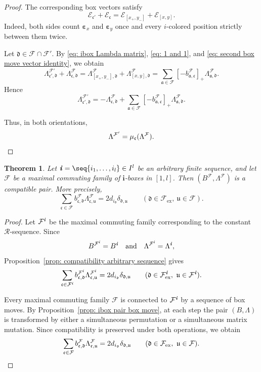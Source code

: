 \documentclass[12pt, leqno]{amsart}
\numberwithin{equation}{section}
\theoremstyle{plain}
\newtheorem{theorem}[lemma]{Theorem}
\theoremstyle{definition}
\newcommand{\ex}{\mathrm{ex}}
\newcommand{\ve}{\boldsymbol{\varepsilon}}
\newcommand{\ii}{ \textbf{\textit{i}}}
\newcommand{\fraka}{\mathfrak{a}}
\newcommand{\frakc}{\mathfrak{c}}
\newcommand{\frakd}{\mathfrak{d}}
\newcommand{\fraku}{\mathfrak{u}}
\newcommand{\bfi}{\mathbf{i}}
\newcommand{\calE}{\mathcal{E}}
\newcommand{\calF}{\mathcal{F}}
\newcommand{\calR}{\mathcal{R}}
\newcommand{\qtq}[1][{and}]{\quad\text{{#1}}\quad}
\begin{document}
\begin{proof}
The corresponding box vectors satisfy
\begin{equation}\label{eq: second box move vector identity}
\calE_{\frakc'}+\calE_{\frakc} = \calE_{[x_+,y_-]}+\calE_{[x,y]}.
\end{equation}
Indeed, both sides count $\ve_x$ and $\ve_y$
once and every $i$-colored position strictly between them twice.

Let $\frakd\in\calF\cap\calF'$. By
\eqref{eq: ibox Lambda matrix},
\eqref{eq: 1 and 1}, and
\eqref{eq: second box move vector identity}, we obtain
\[
\Lambda^{\calF'}_{\frakc',\frakd} +\Lambda^\calF_{\frakc,\frakd}
= \Lambda^\calF_{[x_+,y_-],\frakd} +\Lambda^\calF_{[x,y],\frakd}
= \sum_{\fraka\in\calF} [-b^\calF_{\fraka,\frakc}]_+ \Lambda^\calF_{\fraka,\frakd}.
\]
Hence
\[
\Lambda^{\calF'}_{\frakc',\frakd}= -\Lambda^\calF_{\frakc,\frakd} + \sum_{\fraka\in\calF} [-b^\calF_{\fraka,\frakc}]_+ \Lambda^\calF_{\fraka,\frakd}.
\]

Thus, in both orientations,
\[
\Lambda^{\calF'}=\mu_{\frakc}(\Lambda^\calF).
\qedhere
\]
\end{proof}

\begin{theorem}\label{thm: ibox compatibility}
Let $\ii=\seq{i_1,\ldots,i_l}\in I^l$ be an arbitrary finite sequence,
and let $\calF$ be a maximal commuting family of $\bfi$-boxes in
$[1,l]$. Then $(B^\calF,\Lambda^\calF)$ is a compatible pair. More
precisely,
\[
\sum_{\frakc\in\calF} b^\calF_{\frakc,\frakd}\Lambda^\calF_{\frakc,\fraku}
= 2d_{i_{\frakd}}\delta_{\frakd,\fraku}
\qquad
(\frakd\in\calF_{\ex},\ \fraku\in\calF).
\]
\end{theorem}

\begin{proof}
Let $\calF^\ii$ be the maximal commuting family corresponding to the
constant $\calR$-sequence. Since
\[
B^{\calF^\ii}=B^\ii \qtq \Lambda^{\calF^\ii}=\Lambda^\ii,
\]
Proposition~\ref{prop: compatibility arbitrary sequence} gives
\[
\sum_{\frakc\in\calF^\ii} b^{\calF^\ii}_{\frakc,\frakd} \Lambda^{\calF^\ii}_{\frakc,\fraku}
= 2d_{i_{\frakd}}\delta_{\frakd,\fraku}
\qquad
(\frakd\in\calF^\ii_{\ex},\ \fraku\in\calF^\ii).
\]

Every maximal commuting family $\calF$ is connected to $\calF^\ii$
by a sequence of box moves. By Proposition~\ref{prop: ibox pair box move},
at each step the pair $(B,\Lambda)$ is transformed by either a
simultaneous permutation or a simultaneous matrix mutation.
Since compatibility is preserved under both operations, we obtain
\[
\sum_{\frakc\in\calF} b^\calF_{\frakc,\frakd} \Lambda^\calF_{\frakc,\fraku}
= 2d_{i_{\frakd}}\delta_{\frakd,\fraku} \qquad (\frakd\in\calF_{\ex},\ \fraku\in\calF).
\qedhere
\]
\end{proof}
\end{document}
